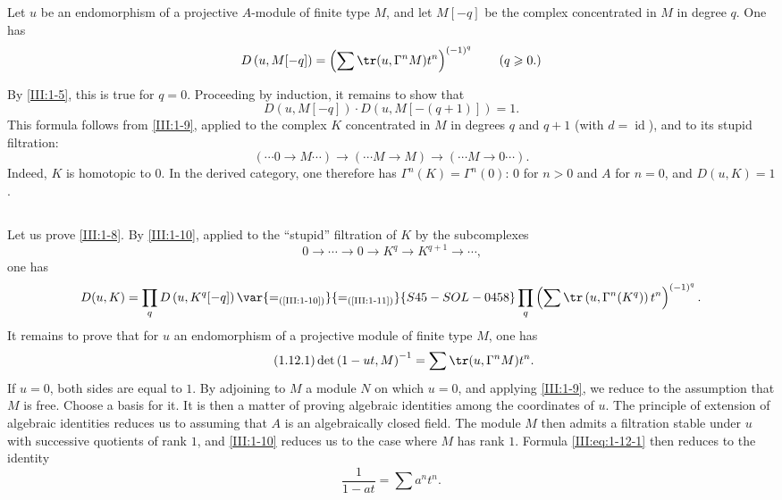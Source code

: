 \begin{lemma_}\label{III:1-11}
Let $u$ be an endomorphism of a projective $A$-module of finite type $M$, and
let $M[-q]$ be the complex concentrated in $M$ in degree $q$. One has
\[
  D\left(u,M[-q]\right) = \left(\sum \tr(u,\Gamma^n M) t^n\right)^{(-1)^q} \qquad \text{($q\geqslant 0$.)}
\]
\end{lemma_}






By \ref{III:1-5}, this is true for $q=0$. Proceeding by induction, it remains
to show that
\[
  D\left(u,M[-q]\right) \cdot D\left(u,M[-(q+1)]\right) = 1 \text{.}
\]
This formula follows from \ref{III:1-9}, applied to the complex $K$
concentrated in $M$ in degrees $q$ and $q+1$ (with
$d=\operatorname{id}$), and to its stupid filtration:
\[
  (\cdots 0 \to M \cdots) \to (\cdots M \to M) \to (\cdots M \to 0 \cdots) \text{.}
\]
Indeed, $K$ is homotopic to $0$. In the derived category, one therefore has
$\Gamma^n(K)=\Gamma^n(0)$: $0$ for $n>0$ and $A$ for $n=0$, and $D(u,K)=1$.





\subsection{}\label{III:1-12}

Let us prove \ref{III:1-8}. By \ref{III:1-10}, applied to the ``stupid''
filtration of $K$ by the subcomplexes
\[
  0 \to \cdots \to 0 \to K^q \to K^{q+1} \to \cdots \text{,}
\]
one has
\[
  D(u,K) = \prod_q D\left(u,K^q[-q]\right) \var{=_{\text{(\ref{III:1-10})}}}{=_{\text{(\ref{III:1-11})}}}{S45-SOL-0458} \prod_q \left(\sum \tr\left(u,\Gamma^n(K^q)\right) t^n \right)^{(-1)^q} \text{.}
\]
It remains to prove that for $u$ an endomorphism of a projective module of
finite type $M$, one has
\begin{equation*}\tag{1.12.1}\label{III:eq:1-12-1}
  \det\left(1-u t,M\right)^{-1} = \sum \tr(u,\Gamma^n M) t^n \text{.}
\end{equation*}
If $u=0$, both sides are equal to $1$. By adjoining to $M$ a module $N$ on
which $u=0$, and applying \ref{III:1-9}, we reduce to the assumption that $M$
is free. Choose a basis for it. It is then a matter of proving algebraic
identities among the coordinates of $u$. The principle of extension of
algebraic identities reduces us to assuming that $A$ is an algebraically
closed field. The module $M$ then admits a filtration stable under $u$ with
successive quotients of rank $1$, and \ref{III:1-10} reduces us to the case
where $M$ has rank $1$. Formula \eqref{III:eq:1-12-1} then reduces to the
identity
\[
  \frac{1}{1-a t} = \sum a^n t^n \text{.}
\]





